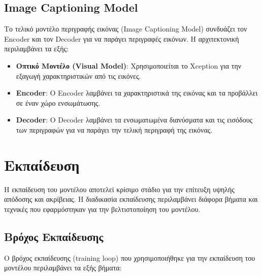 \documentclass[conference]{IEEEtran}
\begin{document}
\subsection{\textlatin{Image Captioning Model}}

Το τελικό μοντέλο περιγραφής εικόνας (\textlatin{Image Captioning Model}) συνδυάζει τον \textlatin{Encoder} και τον \textlatin{Decoder} για να παράγει περιγραφές εικόνων. Η αρχιτεκτονική περιλαμβάνει τα εξής:

\begin{itemize}
    \item \textbf{Οπτικό Μοντέλο (\textlatin{Visual Model})}: Χρησιμοποιείται το \textlatin{Xception} για την εξαγωγή χαρακτηριστικών από τις εικόνες.
    \item \textbf{\textlatin{Encoder}}: Ο \textlatin{Encoder} λαμβάνει τα χαρακτηριστικά της εικόνας και τα προβάλλει σε έναν χώρο ενσωμάτωσης.
    \item \textbf{\textlatin{Decoder}}: Ο \textlatin{Decoder} λαμβάνει τα ενσωματωμένα διανύσματα και τις εισόδους των περιγραφών για να παράγει την τελική περιγραφή της εικόνας.
\end{itemize}

\section{Εκπαίδευση}

Η εκπαίδευση του μοντέλου αποτελεί κρίσιμο στάδιο για την επίτευξη υψηλής απόδοσης και ακρίβειας. Η διαδικασία εκπαίδευσης περιλαμβάνει διάφορα βήματα και τεχνικές που εφαρμόστηκαν για την βελτιστοποίηση του μοντέλου.

\subsection{Βρόχος Εκπαίδευσης}

Ο βρόχος εκπαίδευσης (\textlatin{training loop}) που χρησιμοποιήθηκε για την εκπαίδευση του μοντέλου περιλαμβάνει τα εξής βήματα:
\end{document}
